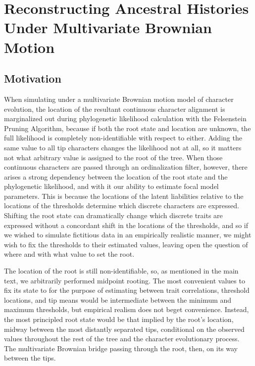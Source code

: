
\chapter[Reconstructing Ancestral Histories]{Reconstructing Ancestral Histories Under Multivariate Brownian Motion}

\label{app:App3}

\clearpage

\section{Motivation}

When simulating under a multivariate Brownian motion model of character evolution, the location of the resultant continuous character alignment is marginalized out during phylogenetic likelihood calculation with the Felsenstein Pruning Algorithm, because if both the root state and location are unknown, the full likelihood is completely non-identifiable with respect to either. Adding the same value to all tip characters changes the likelihood not at all, so it matters not what arbitrary value is assigned to the root of the tree. When those continuous characters are passed through an ordinalization filter, however, there arises a strong dependency between the location of the root state and the phylogenetic likelihood, and with it our ability to estimate focal model parameters. This is because the locations of the latent liabilities relative to the locations of the thresholds determine which discrete characters are expressed. Shifting the root state can dramatically change which discrete traits are expressed without a concordant shift in the locations of the thresholds, and so if we wished to simulate fictitious data in an empirically realistic manner, we might wish to fix the thresholds to their estimated values, leaving open the question of where and with what value to set the root.

The location of the root is still non-identifiable, so, as mentioned in the main text, we arbitrarily performed midpoint rooting. The most convenient values to fix its state to for the purpose of estimating between trait correlations, threshold locations, and tip means would be intermediate between the minimum and maximum thresholds, but empirical realism does not beget convenience. Instead, the most principled root state would be that implied by the root's location, midway between the most distantly separated tips, conditional on the observed values throughout the rest of the tree and the character evolutionary process. The multivariate Brownian bridge passing through the root, then, on its way between the tips.

